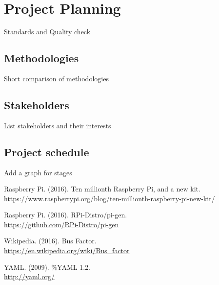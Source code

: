 \documentclass[12pt,a4paper]{report}
\begin{document}
\chapter{Project Planning}

Standards and Quality check
\section{Methodologies}
Short comparison of methodologies
\section{Stakeholders}
List stakeholders and their interests
\section{Project schedule}
Add a graph for stages



\begin{thebibliography}{9}

Raspberry Pi. (2016). Ten millionth Raspberry Pi, and a new kit.
\\\url{https://www.raspberrypi.org/blog/ten-millionth-raspberry-pi-new-kit/}


Raspberry Pi. (2016). RPi-Distro/pi-gen.
\\\url{https://github.com/RPi-Distro/pi-gen}

Wikipedia. (2016). Bus Factor.
\\\url{https://en.wikipedia.org/wiki/Bus_factor}

YAML. (2009). \%YAML 1.2.
\\\url{http://yaml.org/}


\end{thebibliography}
\end{document}
